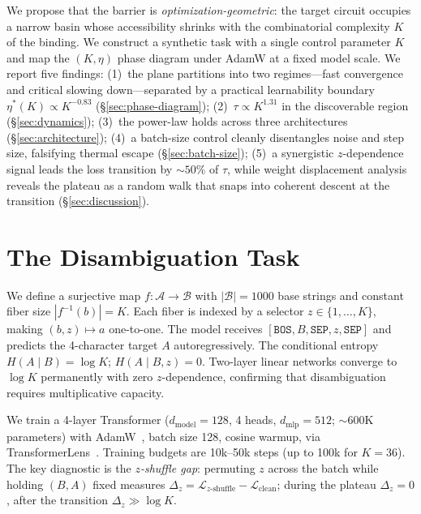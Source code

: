 \documentclass{article}
\begin{document}
We propose that the barrier is \emph{optimization-geometric}: the target circuit occupies a narrow basin whose accessibility shrinks with the combinatorial complexity $K$ of the binding.
We construct a synthetic task with a single control parameter $K$ and map the $(K, \eta)$ phase diagram under AdamW at a fixed model scale.
We report five findings: (1)~the plane partitions into two regimes---fast convergence and critical slowing down---separated by a practical learnability boundary $\eta^*(K) \propto K^{-0.83}$ (\S\ref{sec:phase-diagram}); (2)~$\tau \propto K^{1.31}$ in the discoverable region (\S\ref{sec:dynamics}); (3)~the power-law holds across three architectures (\S\ref{sec:architecture}); (4)~a batch-size control cleanly disentangles noise and step size, falsifying thermal escape (\S\ref{sec:batch-size}); (5)~a synergistic $z$-dependence signal leads the loss transition by ${\sim}50\%$ of $\tau$, while weight displacement analysis reveals the plateau as a random walk that snaps into coherent descent at the transition (\S\ref{sec:discussion}).


\section{The Disambiguation Task}
\label{sec:task}

We define a surjective map $f: \mathcal{A} \to \mathcal{B}$ with $|\mathcal{B}| = 1000$ base strings and constant fiber size $|f^{-1}(b)| = K$.
Each fiber is indexed by a selector $z \in \{1, \ldots, K\}$, making $(b, z) \mapsto a$ one-to-one.
The model receives $[\texttt{BOS}, B, \texttt{SEP}, z, \texttt{SEP}]$ and predicts the 4-character target $A$ autoregressively.
The conditional entropy $H(A \mid B) = \log K$; $H(A \mid B, z) = 0$.
Two-layer linear networks converge to $\log K$ permanently with zero $z$-dependence, confirming that disambiguation requires multiplicative capacity.

We train a 4-layer Transformer ($d_\text{model} = 128$, 4 heads, $d_\text{mlp} = 512$; ${\sim}600$K parameters) with AdamW~\citep{loshchilov2019adamw}, batch size 128, cosine warmup, via TransformerLens~\citep{nanda2022transformerlens}.
Training budgets are 10k--50k steps (up to 100k for $K{=}36$).
The key diagnostic is the \emph{$z$-shuffle gap}: permuting $z$ across the batch while holding $(B, A)$ fixed measures $\Delta_z = \mathcal{L}_{z\text{-shuffle}} - \mathcal{L}_\text{clean}$; during the plateau $\Delta_z = 0$, after the transition $\Delta_z \gg \log K$.
\end{document}
